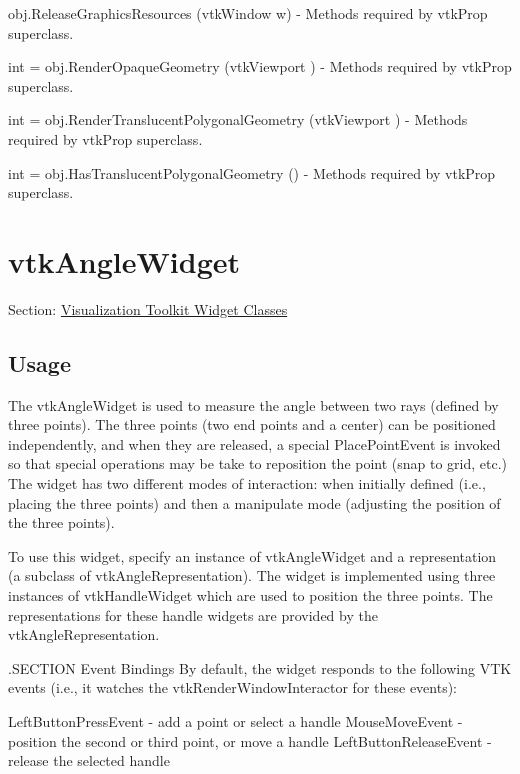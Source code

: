 \begin{DoxyItemize}
\item {\ttfamily obj.\-Release\-Graphics\-Resources (vtk\-Window w)} -\/ Methods required by vtk\-Prop superclass.  
\item {\ttfamily int = obj.\-Render\-Opaque\-Geometry (vtk\-Viewport )} -\/ Methods required by vtk\-Prop superclass.  
\item {\ttfamily int = obj.\-Render\-Translucent\-Polygonal\-Geometry (vtk\-Viewport )} -\/ Methods required by vtk\-Prop superclass.  
\item {\ttfamily int = obj.\-Has\-Translucent\-Polygonal\-Geometry ()} -\/ Methods required by vtk\-Prop superclass.  
\end{DoxyItemize}\hypertarget{vtkwidgets_vtkanglewidget}{}\section{vtk\-Angle\-Widget}\label{vtkwidgets_vtkanglewidget}
Section\-: \hyperlink{sec_vtkwidgets}{Visualization Toolkit Widget Classes} \hypertarget{vtkwidgets_vtkxyplotwidget_Usage}{}\subsection{Usage}\label{vtkwidgets_vtkxyplotwidget_Usage}
The vtk\-Angle\-Widget is used to measure the angle between two rays (defined by three points). The three points (two end points and a center) can be positioned independently, and when they are released, a special Place\-Point\-Event is invoked so that special operations may be take to reposition the point (snap to grid, etc.) The widget has two different modes of interaction\-: when initially defined (i.\-e., placing the three points) and then a manipulate mode (adjusting the position of the three points).

To use this widget, specify an instance of vtk\-Angle\-Widget and a representation (a subclass of vtk\-Angle\-Representation). The widget is implemented using three instances of vtk\-Handle\-Widget which are used to position the three points. The representations for these handle widgets are provided by the vtk\-Angle\-Representation.

.S\-E\-C\-T\-I\-O\-N Event Bindings By default, the widget responds to the following V\-T\-K events (i.\-e., it watches the vtk\-Render\-Window\-Interactor for these events)\-: 
\begin{DoxyPre}
   LeftButtonPressEvent - add a point or select a handle 
   MouseMoveEvent - position the second or third point, or move a handle
   LeftButtonReleaseEvent - release the selected handle
 \end{DoxyPre}


